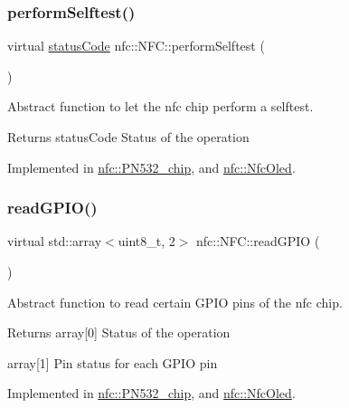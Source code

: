 \subsubsection{\texorpdfstring{perform\+Selftest()}{performSelftest()}}
{\footnotesize\ttfamily virtual \hyperlink{declarations_8h_ae1d20c5a38cae82ccaa6a77be3fd264b}{status\+Code} nfc\+::\+N\+F\+C\+::perform\+Selftest (\begin{DoxyParamCaption}{ }\end{DoxyParamCaption})\hspace{0.3cm}{\ttfamily [pure virtual]}}



Abstract function to let the nfc chip perform a selftest. 

\begin{DoxyReturn}{Returns}
status\+Code Status of the operation 
\end{DoxyReturn}


Implemented in \hyperlink{classnfc_1_1PN532__chip_af47e591d52986e2241b80f1581af34ab}{nfc\+::\+P\+N532\+\_\+chip}, and \hyperlink{classnfc_1_1NfcOled_a76e1f57a8cf76b22029df6da4d8bacd2}{nfc\+::\+Nfc\+Oled}.

\mbox{\label{classnfc_1_1NFC_a2d2ccf98ac7faaa8652a69c0242e031c}} 
\subsubsection{\texorpdfstring{read\+G\+P\+I\+O()}{readGPIO()}}
{\footnotesize\ttfamily virtual std\+::array$<$uint8\+\_\+t, 2$>$ nfc\+::\+N\+F\+C\+::read\+G\+P\+IO (\begin{DoxyParamCaption}{ }\end{DoxyParamCaption})\hspace{0.3cm}{\ttfamily [pure virtual]}}



Abstract function to read certain G\+P\+IO pins of the nfc chip. 

\begin{DoxyReturn}{Returns}
array\mbox{[}0\mbox{]} Status of the operation 

array\mbox{[}1\mbox{]} Pin status for each G\+P\+IO pin 
\end{DoxyReturn}


Implemented in \hyperlink{classnfc_1_1PN532__chip_a1c7e2ace0798d1e6b11bbab4a5e632c5}{nfc\+::\+P\+N532\+\_\+chip}, and \hyperlink{classnfc_1_1NfcOled_a0dd17c714697e9883aa35962c5229625}{nfc\+::\+Nfc\+Oled}.

